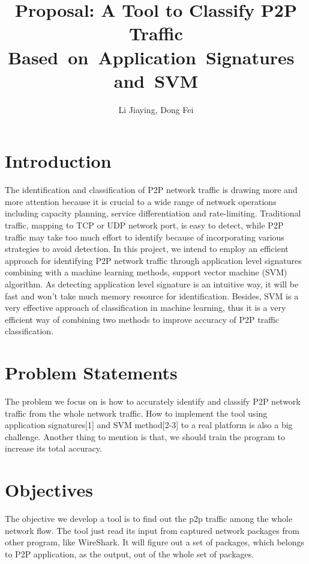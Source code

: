 \documentclass[10pt, a4paper, onecolumn, fleqn]{article}
\begin{document}
\title{Proposal: A Tool to Classify P2P Traffic \mbox{Based on Application Signatures and SVM}}
\author{Li Jiaying, Dong Fei}
\maketitle

\vspace{-0.8cm}
\section{Introduction}
The identification and classification of P2P network traffic is drawing more and more attention 
because it is crucial to a wide range of network operations including capacity planning, 
service differentiation and rate-limiting. 
Traditional traffic, mapping to TCP or UDP network port, is easy to detect, 
while P2P traffic may take too much effort to identify because of incorporating various strategies to avoid detection. 
In this project, we intend to employ an efficient approach for identifying P2P network traffic 
through application level signatures combining with a machine learning methods, support vector machine (SVM) algorithm. 
As detecting application level signature is an intuitive way, 
it will be fast and won't take much memory resource for identification.
Besides, SVM is a very effective approach of classification in machine learning, 
thus it is a very efficient way of combining two methods to improve accuracy of P2P traffic classification.


\section{Problem Statements}
The problem we focus on is how to accurately identify and classify P2P network traffic from the whole network traffic.
How to implement the tool using application signatures[1] and SVM method[2-3] to a real platform is also a big challenge.
Another thing to mention is that, we should train the program to increase its total accuracy.


\section{Objectives}
The objective we develop a tool is to find out the p2p traffic among the whole network flow.
The tool just read its input from captured network packages from other program, like WireShark.
It will figure out a set of packages, which belongs to P2P application, as the output, 
out of the whole set of packages.
\end{document}
